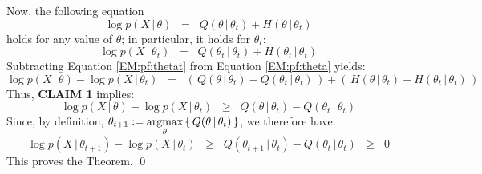 \vskip 0.3cm
Now, the following equation
\begin{equation}
\label{EM:pf:theta}
\log p(X\,|\,\theta)
\;\; = \;\;
Q(\theta\,|\,\theta_{t}) + H(\theta\,|\,\theta_{t})
\end{equation}
holds for any value of $\theta$; in particular, it holds for $\theta_{t}$:
\begin{equation}
\label{EM:pf:thetat}
\log p(X\,|\,\theta_{t})
\;\; = \;\;
Q(\theta_{t}\,|\,\theta_{t}) + H(\theta_{t}\,|\,\theta_{t})
\end{equation}
Subtracting Equation \eqref{EM:pf:thetat} from Equation \eqref{EM:pf:theta} yields:
\begin{equation}
\log p(X\,|\,\theta) - \log p(X\,|\,\theta_{t})
\;\; = \;\;
\left(\,Q(\theta\,|\,\theta_{t}) - Q(\theta_{t}\,|\,\theta_{t})\,\right)
+
\left(\,H(\theta\,|\,\theta_{t}) - H(\theta_{t}\,|\,\theta_{t})\,\right)
\end{equation}
Thus, \textbf{CLAIM 1} implies:
\begin{equation}
\log p(X\,|\,\theta) - \log p(X\,|\,\theta_{t})
\;\; \geq \;\;
Q(\theta\,|\,\theta_{t}) - Q(\theta_{t}\,|\,\theta_{t})
\end{equation}
Since, by definition, $\theta_{t+1} := \underset{\theta}{\textnormal{argmax}}\left\{\,Q(\theta\,|\,\theta_{t})\,\right\}$,
we therefore have:
\begin{equation}
\log p(X\,|\,\theta_{t+1}) - \log p(X\,|\,\theta_{t})
\;\; \geq \;\;
Q(\theta_{t+1}\,|\,\theta_{t}) - Q(\theta_{t}\,|\,\theta_{t})
\;\; \geq \;\;
0
\end{equation}
This proves the Theorem.  \qed


